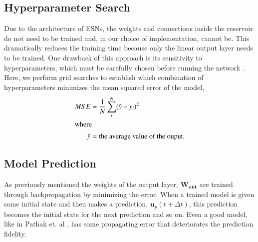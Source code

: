 \subsection{Hyperparameter Search}
Due to the architecture of \acrshort{ESN}s, the weights and connections
inside the reservoir do not need to be trained and, in our choice of
implementation, cannot be. This dramatically reduces the training time because
only the linear output layer needs to be trained. One drawback of this approach
is its sensitivity to hyperparameters, which must be carefully chosen before
running the network \cite{ pathak_model-free_2018,
lukosevicius_practical_2012, lukosevicius_reservoir_2009,gallicchio_deep_2019}.
Here, we perform grid searches
to establish which combination of hyperparameters minimizes the mean squared
error of the model,
\begin{align}
	MSE &= \frac{1}{N}\sum_i^N (\hat{y} - y_i)^2\\
	\intertext{where}
	\hat{y} &= \mbox{the average value of the ouput.}\nonumber
\end{align}

\subsection{Model Prediction}
As previously mentioned the weights of the output layer, $\bm{W_{out}}$ are
trained through backpropagation by minimizing the error. When a trained model
is given some initial state and then makes a prediction, $\bm{u}_p(t+\Delta
t)$, this prediction becomes the initial state for the next prediction and so
on. Even a good model, like in Pathak et. al \cite{pathak_model-free_2018}, has
some propagating error that deteriorates the prediction fidelity.
